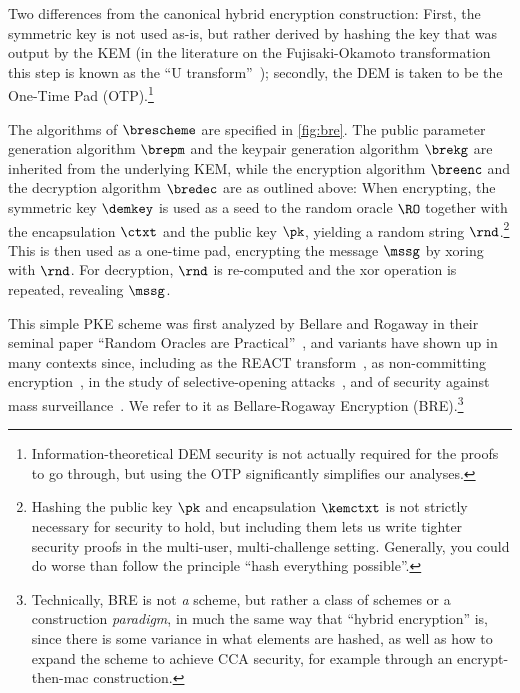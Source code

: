   Two differences from the canonical
    hybrid encryption construction: First, the symmetric key is not used as-is,
    but rather derived by hashing the key that was output by the KEM (in the literature
    on the Fujisaki-Okamoto transformation~\cite{C:FujOka99} this step is known as
    the ``U transform''~\cite{TCC:HofHovKil17}); secondly, the
    DEM is taken to be the One-Time Pad (OTP).\footnote{
      Information-theoretical DEM security
      is not actually required for the proofs to go through, 
      but using the OTP significantly simplifies our analyses.
    } 

  The algorithms of $\brescheme$ are specified in \cref{fig:bre}. The public parameter
    generation algorithm $\brepm$ and the keypair generation algorithm $\brekg$
    are inherited from the underlying KEM, while the encryption algorithm
    $\breenc$ and the decryption algorithm $\bredec$ are as outlined above: When
    encrypting, the symmetric key $\demkey$ is used as a seed to the random
    oracle $\RO$ together with the encapsulation $\ctxt$ and the public key
    $\pk$, yielding a random string $\rnd$.\footnote{
      Hashing the public key $\pk$ and encapsulation $\kemctxt$ is not strictly necessary for 
      security to hold, but including them lets us write tighter security 
      proofs in the multi-user, multi-challenge setting.
      Generally, you could do worse than follow the principle ``hash everything possible''.
    } This is then used as a one-time pad, encrypting the message $\mssg$ by
    xoring with $\rnd$. For decryption, $\rnd$ is re-computed and the xor
    operation is repeated, revealing $\mssg$.

  This simple PKE scheme 
    was first analyzed by Bellare and
    Rogaway in their seminal paper ``Random Oracles are
    Practical''~\cite{CCS:BelRog93},
    and variants have shown up in many contexts since,
    including as the REACT transform~\cite{RSA:OkaPoi01}, as non-committing
    encryption~\cite{C:Nielsen02a,CSF:CLNS17}, in the study of
    selective-opening attacks~\cite{PKC:HJKS15,AC:LYHW21}, and 
    of security against mass surveillance~\cite{PKC:BruHeuSta24}. We refer to it as
    Bellare-Rogaway Encryption (BRE).\footnote{
      Technically, BRE is not \emph a scheme, but rather a class of schemes or
      a construction \emph{paradigm}, in much the same way that ``hybrid encryption'' is,
      since there is some variance in what elements are hashed, as well as how
      to expand the scheme to achieve CCA security, for example through an
      encrypt-then-mac construction.
    }

